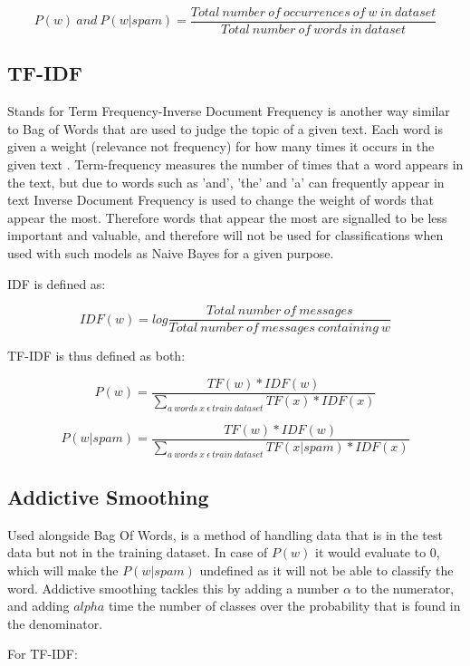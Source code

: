 \documentclass[oneside, 12pt]{article}
\begin{document}
			\[P(w) \ and\ P(w|spam) = \frac{Total\ number\ of\ occurrences\ of\ w\ in\ dataset}{Total\ number\ of\ words\ in\ dataset}\]
			
			\subsection{TF-IDF}
			Stands for Term Frequency-Inverse Document Frequency is another way similar to Bag of Words that are used to judge the topic of a given text. Each word is given a weight (relevance not frequency) for how many times it occurs in the given text \cite{TFIDFBOW}. 
			Term-frequency measures the number of times that a word appears in the text, but due to words such as 'and', 'the' and 'a' can frequently appear in text Inverse Document Frequency is used to change the weight of words that appear the most. Therefore words that appear the most are signalled to be less important and valuable, and therefore will not be used for classifications when used with such models as Naive Bayes for a given purpose. \cite{TFIDFBOW}
			\newline
			
			IDF is defined as:
			
			\[IDF(w) = log\frac{Total\ number\ of\ messages}{Total\ number\ of\ messages\ containing\ w}\]
			
			TF-IDF is thus defined as both:
			
			\[P(w) = \frac{TF(w)*IDF(w)}{\sum _{a\ words\ x\ \epsilon\ train\ dataset} TF(x)*IDF(x)}\]
			
			\[P(w|spam) = \frac{TF(w)*IDF(w)}{\sum _{a\ words\ x\ \epsilon\ train\ dataset} TF(x|spam)*IDF(x)}\]
				
			\cite{SpamCScratch}
			
			\subsection{Addictive Smoothing}
			Used alongside Bag Of Words, is a method of handling data that is in the test data but not in the training dataset. In case of $P(w)$ it would evaluate to 0, which will make the $P(w|spam)$ undefined as it will not be able to classify the word. Addictive smoothing tackles this by adding a number $\alpha$ to the numerator, and adding $alpha$ time the number of classes over the probability that is found in the denominator. \cite{SpamCScratch}
			\newline
			
			For TF-IDF:
			
\end{document}
